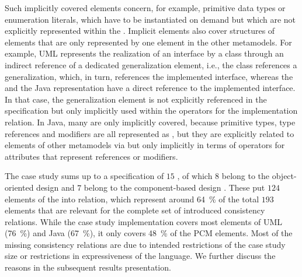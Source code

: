 Such implicitly covered elements concern, for example, primitive data types or enumeration literals, which have to be instantiated on demand but which are not explicitly represented within the \commonalities.
Implicit elements also cover structures of elements that are only represented by one element in the other metamodels.
For example, \gls{UML} represents the realization of an interface by a class through an indirect reference of a dedicated generalization element, i.e., the class references a generalization, which, in turn, references the implemented interface, whereas the \commonality and the Java representation have a direct reference to the implemented interface.
In that case, the generalization element is not explicitly referenced in the \commonality specification but only implicitly used within the operators for the implementation relation.
In Java, many \metaclasses are only implicitly covered, because primitive types, type references and modifiers are all represented as \metaclasses, but they are explicitly related to elements of other metamodels via \commonalities but only implicitly in terms of operators for attributes that represent references or modifiers.

The case study sums up to a specification of $15$ \commonalities, of which $8$ belong to the object-oriented design \conceptmetamodel and $7$ belong to the component-based design \conceptmetamodel.
These \commonalities put $124$ elements of the \concretemetamodels into relation, which represent around \SI{64}{\percent} of the total $193$ elements that are relevant for the complete set of introduced consistency relations.
While the case study implementation covers most elements of \gls{UML} (\SI{76}{\percent}) and Java (\SI{67}{\percent}), it only covers \SI{48}{\percent} of the \gls{PCM} elements.
Most of the missing consistency relations are due to intended restrictions of the case study size or restrictions in expressiveness of the \commonalities language.
We further discuss the reasons in the subsequent results presentation.


